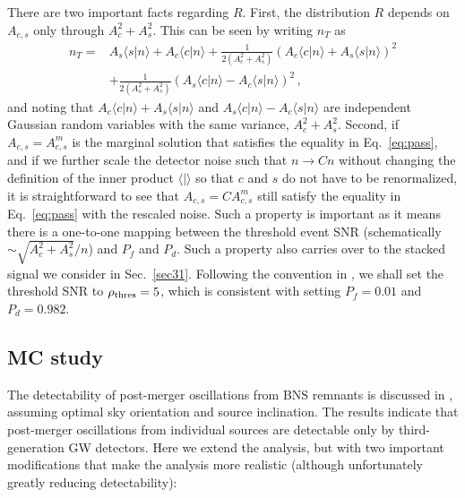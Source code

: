 \documentclass[prd,aps,floatfix,superscriptaddress,nofootinbib,twocolumn,10pt,English]{revtex4-1}
\begin{document}
There are two important facts regarding $R$. First, the distribution $R$ depends on $A_{c,s}$ only through $A^2_c+A^2_s$. This can be seen by writing  $n_T$ as 
\begin{align}
n_T =& A_s \langle s | n\rangle +A_c \langle c |n \rangle
+\frac{1}{2(A^2_c+A^2_s)} (A_c \langle c | n\rangle +A_s \langle s |n \rangle )^2 \nonumber \\
&+\frac{1}{2(A^2_s+A^2_s)} ( A_s \langle c | n\rangle -A_c \langle s |n \rangle )^2\,,
\end{align}
and noting that $A_c \langle c | n\rangle +A_s \langle s |n \rangle$ and
$A_s \langle c | n\rangle -A_c \langle s |n \rangle$ are independent
Gaussian random variables with the same variance, $A^2_c+A^2_s$.
Second, if $A_{c,s}=A^m_{c,s}$ is the marginal solution that satisfies
the equality in Eq.~\eqref{eq:pass}, and if we further scale the
detector noise such that $n \rightarrow C n$ without changing the
definition of the inner product $\langle | \rangle$ so that $c$ and $s$ do not
have to be renormalized, it is straightforward to see that $A_{c,s} =C
A^m_{c,s}$ still satisfy the equality in Eq.~\eqref{eq:pass} with the
rescaled noise. Such a property is important as it means there is a
one-to-one mapping between the threshold event SNR (schematically $\sim \sqrt{A_c^2+A_s^2}/n$) and $P_f$
and $P_d$. Such a property also carries over to the stacked signal we
consider in Sec.~\ref{sec31}. Following the convention in
\cite{clark2016observing}, we shall set the threshold SNR to
$\rho_{\rm thres} = 5$, which is consistent with setting $P_f=0.01$ and
$P_d =0.982$.





\subsection{MC study}\label{sec22}

The detectability of post-merger oscillations from BNS remnants is
discussed in \cite{clark2016observing}, assuming optimal sky
orientation and source inclination. The results indicate that
post-merger oscillations from individual sources are detectable only
by third-generation GW detectors. Here we extend the analysis, but
with two important modifications that make the analysis more realistic
(although unfortunately greatly reducing detectability):
\end{document}
